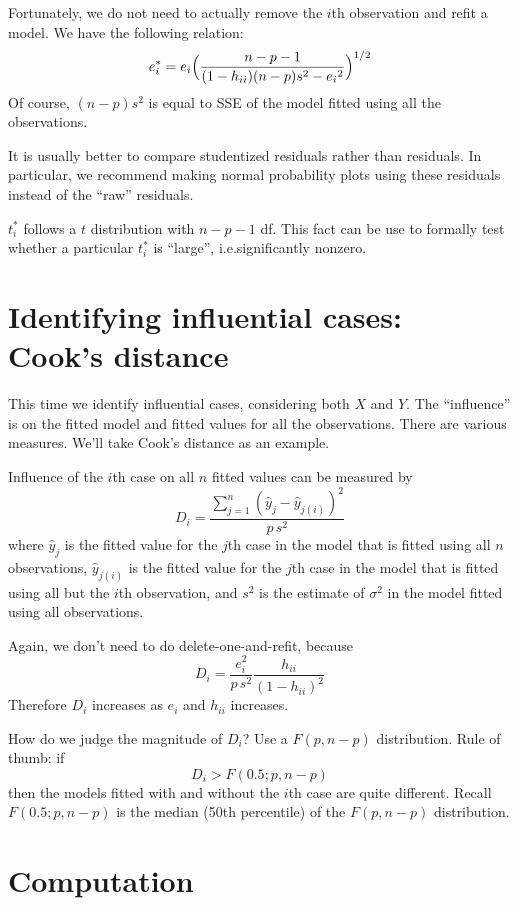 \documentclass[12pt]{article}
\begin{document}
Fortunately,
we do not need to actually remove the $i$th observation and refit
a model.
We have the following relation:
\[
e_i^*
= e_i \Bigl(\frac{n - p - 1}
    {(1- h_{ii})(n-p)s^2 - {e_i}^2}\Bigr)^{1/2}
\]
Of course, $(n-p)s^2$ is equal to SSE of the model fitted using all
the observations.

It is usually better to compare studentized residuals
rather than residuals.
In particular, we recommend making normal probability plots using these
residuals instead of the ``raw'' residuals.

$t_i^*$ follows a $t$ distribution with $n-p-1$ df.
This fact can be use to formally test whether a particular
$t_i^*$ is ``large'', i.e.\@ significantly nonzero.

\section{Identifying influential cases:\\
    Cook's distance}

This time we identify influential cases,
considering both $X$ and $Y$.
The ``influence'' is on
the fitted model and fitted values for all the observations.
There are various measures.
We'll take Cook's distance as an example.

Influence of the $i$th case on all $n$ fitted values
can be measured by
\[
D_i
= \frac{\sum_{j=1}^n (\hat{y}_j - \hat{y}_{j(i)})^2}
        {p\, s^2}
\]
where $\hat{y}_j$ is the fitted value for the $j$th case
in the model that is fitted using all $n$ observations,
$\hat{y}_{j(i)}$ is the fitted value for the $j$th case
in the model that is fitted using all but the $i$th observation,
and
$s^2$ is the estimate of $\sigma^2$ in the model fitted using
all observations.

Again, we don't need to do delete-one-and-refit,
because
\[
D_i = \frac{e_i^2}{p\, s^2}\frac{h_{ii}}{(1 - h_{ii})^2}
\]
Therefore $D_i$ increases as $e_i$ and $h_{ii}$ increases.

How do we judge the magnitude of $D_i$?
Use a $F(p, n-p)$ distribution.
Rule of thumb:
if
\[D_i > F(0.5; p, n-p)\]
then the models fitted with and without the
$i$th case are quite different.
Recall $F(0.5; p, n-p)$ is the median (50th percentile)
of the $F(p, n-p)$ distribution.

\section{Computation}
\end{document}
